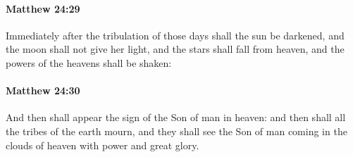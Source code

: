 		\paragraph{Matthew 24:29} %
			\label{MATTHEW-24-29}

			Immediately after the tribulation of those days shall the sun be darkened, and the moon shall not give her light, and the stars shall fall from heaven, and the powers of the heavens shall be shaken:

			\begin{framed}
			\scriptsize
				\begin{compactdesc}
					\item[SBLG] 
				\end{compactdesc}
			\end{framed}

		\paragraph{Matthew 24:30} %
			\label{MATTHEW-24-30}

			And then shall appear the sign of the Son of man in heaven: and then shall all the tribes of the earth mourn, and they shall see the Son of man coming in the clouds of heaven with power and great glory.

